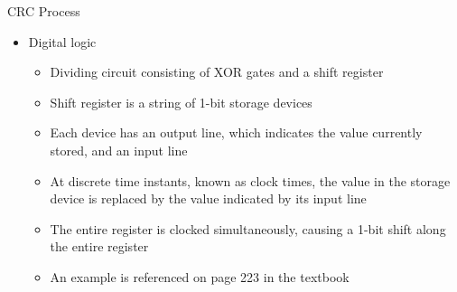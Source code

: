 \documentclass[pdflatex,compress]{beamer}
\begin{document}
\begin{frame}{CRC Process}
	\begin{itemize}
		\item Digital logic
		\begin{itemize}
			\item Dividing circuit consisting of XOR gates and a shift register
			\item Shift register is a string of 1-bit storage devices
			\item Each device has an output line, which indicates the value currently stored, and an input line
			\item At discrete time instants, known as clock times, the value in the storage device is replaced by the value indicated by its input line
			\item The entire register is clocked simultaneously, causing a 1-bit shift along the entire register
			\item An example is referenced on page 223 in the textbook
		\end{itemize}
	\end{itemize}
\end{frame}
\end{document}
